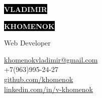 \documentclass[9pt]{template}
\begin{document}
\begin{minipage}[t]{0.55\textwidth}
	\vspace{-\baselineskip}
		
	\colorbox{black}{{\HUGE\textcolor{white}{\textbf{\MakeUppercase{Vladimir}}}}}
		
	\colorbox{black}{{\HUGE\textcolor{white}{\textbf{\MakeUppercase{Khomenok}}}}}
		
	\vspace{6pt}
		
	{\huge Web Developer}
\end{minipage}
\begin{minipage}[t]{0.275\textwidth}
		
	\vspace{-\baselineskip}	
	\href{mailto:khomenokvladimir@gmail.com}{khomenokvladimir@gmail.com}\\
	+7(963)995-24-27\\ 
		
	\href{https://github.com/khomenok}{github.com/khomenok}\\
	\href{https://linkedin.com/in/v-khomenok}{linkedin.com/in/v-khomenok}
\end{minipage}

\vspace{0.5cm}


\end{document}
